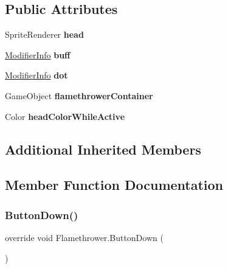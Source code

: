 \subsection*{Public Attributes}
\begin{DoxyCompactItemize}
\item 
\hypertarget{class_flamethrower_a6c196f6a84dafd9bcd72a0f5052d1115}{}\label{class_flamethrower_a6c196f6a84dafd9bcd72a0f5052d1115} 
Sprite\+Renderer {\bfseries head}
\item 
\hypertarget{class_flamethrower_a18ebe86d2a0bceb7e04a2cc2ecd26dae}{}\label{class_flamethrower_a18ebe86d2a0bceb7e04a2cc2ecd26dae} 
\hyperlink{struct_modifier_info}{Modifier\+Info} {\bfseries buff}
\item 
\hypertarget{class_flamethrower_a075917eb3ffab80a06f8b5bc34ccf583}{}\label{class_flamethrower_a075917eb3ffab80a06f8b5bc34ccf583} 
\hyperlink{struct_modifier_info}{Modifier\+Info} {\bfseries dot}
\item 
\hypertarget{class_flamethrower_a6c50e2b5a5767205740defb3c6c86db2}{}\label{class_flamethrower_a6c50e2b5a5767205740defb3c6c86db2} 
Game\+Object {\bfseries flamethrower\+Container}
\item 
\hypertarget{class_flamethrower_a245677e02bdb4a097e44fa6cfe350f87}{}\label{class_flamethrower_a245677e02bdb4a097e44fa6cfe350f87} 
Color {\bfseries head\+Color\+While\+Active}
\end{DoxyCompactItemize}
\subsection*{Additional Inherited Members}


\subsection{Member Function Documentation}
\hypertarget{class_flamethrower_ad41102fce610be1bae9c795f4d720df5}{}\label{class_flamethrower_ad41102fce610be1bae9c795f4d720df5} 
\subsubsection{\texorpdfstring{Button\+Down()}{ButtonDown()}}
{\footnotesize\ttfamily override void Flamethrower.\+Button\+Down (\begin{DoxyParamCaption}{ }\end{DoxyParamCaption})\hspace{0.3cm}{\ttfamily [virtual]}}



